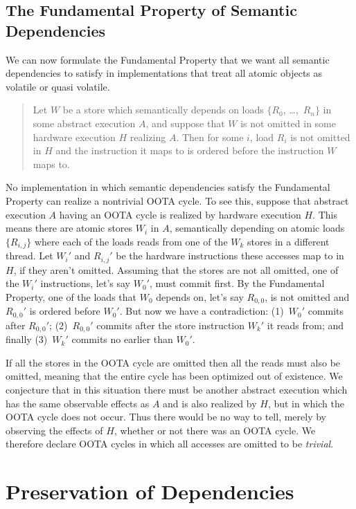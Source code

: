 \subsection{The Fundamental Property of Semantic Dependencies}
\label{sec:The Fundamental Property of Semantic Dependencies}

We can now formulate the Fundamental Property that we want all semantic
dependencies to satisfy in implementations that treat all atomic objects
as volatile or quasi volatile.
\begin{quote}
Let $W$ be a store which semantically depends on loads
$\{R_0$, \ldots,~$R_n\}$ in some abstract execution $A$,
and suppose that $W$ is not
omitted in some hardware execution $H$ realizing $A$.
Then for some $i$, load $R_i$ is not omitted in $H$ and the
instruction it maps to is ordered before the instruction $W$ maps to.
\end{quote}

No implementation in which semantic dependencies satisfy the Fundamental
Property can realize a nontrivial OOTA cycle.
To see this, suppose that abstract execution $A$ having an OOTA cycle
is realized by hardware execution $H$.
This means there are atomic stores $W_i$ in $A$,
semantically depending on atomic loads
$\{R_{i,j}\}$ where each of the loads reads from one of the $W_k$
stores in a different thread.
Let $W_i'$ and $R_{i,j}'$ be the hardware instructions these accesses
map to in $H$, if they aren't omitted.
Assuming that the stores are not all omitted,
one of the $W_i'$ instructions, let's say $W_0'$, must commit first.
By the Fundamental Property, one of the loads that $W_0$ depends on,
let's say $R_{0,0}$, is not omitted and $R_{0,0}'$ is ordered before $W_0'$.
But now we have a contradiction:
(1)~$W_0'$ commits after $R_{0,0}'$;
(2)~$R_{0,0}'$ commits after the store instruction $W_k'$ it reads from;
and finally
(3)~$W_k'$ commits no earlier than $W_0'$.

If all the stores in the OOTA cycle are omitted then all the reads must
also be omitted, meaning that the entire cycle has been optimized
out of existence.
We conjecture that in this situation there must be another abstract
execution which has the same observable effects as $A$ and is also
realized by $H$, but in which the OOTA cycle does not occur.
Thus there would be no way to tell, merely by observing the effects of
$H$, whether or not there was an OOTA cycle.
We therefore declare OOTA cycles in which all accesses are omitted to
be \emph{trivial}.

\section{Preservation of Dependencies}
\label{sec:Preservation of Dependencies}

